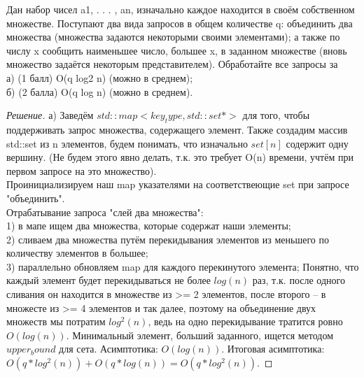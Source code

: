 \documentclass[12pt]{article}
\newenvironment{problem}[2][Задача]{\begin{trivlist}
\item[\hskip \labelsep {\bfseries #1}\hskip \labelsep {\bfseries #2.}]}{\end{trivlist}}
\newenvironment{solution}[0]{\begin{proof}[Решение]}{\end{proof}}
\begin{document}
 
\newpage
\begin{problem}{6}
    Дан набор чисел a1, . . . , an, изначально каждое находится в своём собственном множестве. Поступают
два вида запросов в общем количестве q: объединить два множества (множества задаются некоторыми
своими элементами); а также по числу x сообщить наименьшее число, большее x, в заданном множестве
(вновь множество задаётся некоторым представителем). Обработайте все запросы за
\\а) (1 балл) O(q log2 n) (можно в среднем);
\\б) (2 балла) O(q log n) (можно в среднем).
\end{problem}

\begin{solution}
    а)
    Заведём $std::map <key_type, std::set*>$ для того, чтобы поддерживать запрос множества, содержащего элемент.
    Также создадим массив std::set из n элементов, будем понимать, что изначально $set[n]$ содержит одну вершину.
    (Не будем этого явно делать, т.к. это требует O(n) времени, учтём при первом запросе на это множество).
    \\Проинициализируем наш map указателями на соответствеющие set при запросе "объединить".
    \\Отрабатывание запроса "слей два множества":
    \\1) в мапе ищем два множества, которые содержат наши элементы;
    \\2) сливаем два множества путём перекидывания элементов из меньшего по количеству элементов в большее;
    \\3) параллельно обновляем map для каждого перекинутого элемента;
    Понятно, что каждый элемент будет перекидываться не более $log(n)$ раз, т.к. после одного сливания
    он находится в множестве из >= 2 элементов, после второго -- в множесте из >= 4 элементов и так далее,
    поэтому на объединение двух множеств мы потратим $log^2(n)$, ведь на одно перекидывание тратится ровно $O(log(n))$.
    Минимальный элемент, больший заданного, ищется методом $upper_bound$ для сета. Асимптотика: $O(log(n))$.
    Итоговая асимптотика: $O(q*log^2(n))+O(q*log(n)) = O(q*log^2(n))$. 

\end{solution}
 
\end{document}
